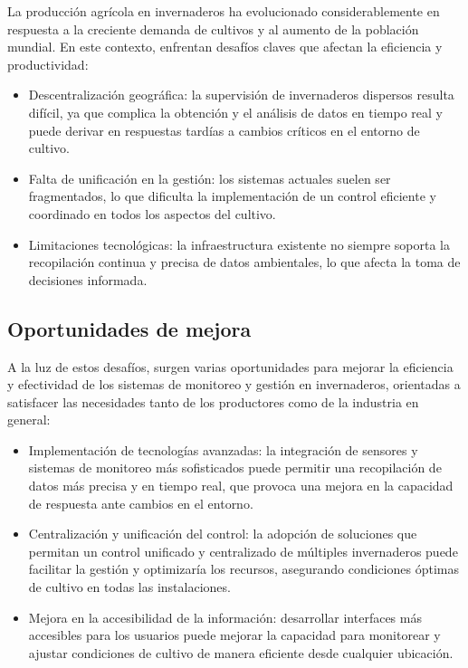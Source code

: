 La producción agrícola en invernaderos ha evolucionado considerablemente en respuesta a la creciente demanda de cultivos y al aumento de la población mundial. En este contexto, enfrentan desafíos claves que afectan la eficiencia y productividad:

\begin{itemize}
	\item Descentralización geográfica: la supervisión de invernaderos dispersos resulta difícil, ya que complica la obtención y el análisis de datos en tiempo real y puede derivar en respuestas tardías a cambios críticos en el entorno de cultivo.
	\item Falta de unificación en la gestión: los sistemas actuales suelen ser fragmentados, lo que dificulta la implementación de un control eficiente y coordinado en todos los aspectos del cultivo.
	\item Limitaciones tecnológicas: la infraestructura existente no siempre soporta la recopilación continua y precisa de datos ambientales, lo que afecta la toma de decisiones informada.
\end{itemize}

\subsection{Oportunidades de mejora}

A la luz de estos desafíos, surgen varias oportunidades para mejorar la eficiencia y efectividad de los sistemas de monitoreo y gestión en invernaderos, orientadas a satisfacer las necesidades tanto de los productores como de la industria en general:

\begin{itemize}
	\item Implementación de tecnologías avanzadas: la integración de sensores y sistemas de monitoreo más sofisticados puede permitir una recopilación de datos más precisa y en tiempo real, que provoca una mejora en la capacidad de respuesta ante cambios en el entorno.
	\item Centralización y unificación del control: la adopción de soluciones que permitan un control unificado y centralizado de múltiples invernaderos puede facilitar la gestión y optimizaría los recursos, asegurando condiciones óptimas de cultivo en todas las instalaciones.
	\item Mejora en la accesibilidad de la información: desarrollar interfaces más accesibles para los usuarios puede mejorar la capacidad para monitorear y ajustar condiciones de cultivo de manera eficiente desde cualquier ubicación.
\end{itemize}

